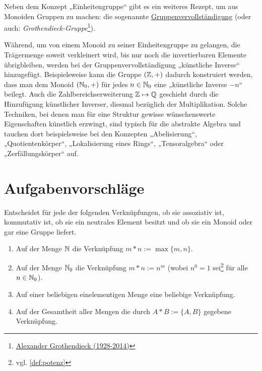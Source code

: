 \begin{vorschau}[* Gruppenvervollständigung] \label{gruppenvervollstaendigung}
    Neben dem Konzept „Einheitengruppe“ gibt es ein weiteres Rezept, um aus Monoiden Gruppen zu machen: die sogenannte \href{https://de.wikipedia.org/wiki/Grothendieck-Gruppe}{Gruppenvervollständigung} (oder auch: \emph{Grothendieck-Gruppe}\footnote{\href{https://de.wikipedia.org/wiki/Alexander_Grothendieck}{Alexander Grothendieck (1928-2014)}}).
    
    Während, um von einem Monoid zu seiner Einheitengruppe zu gelangen, die Trägermenge soweit verkleinert wird, bis nur noch die invertierbaren Elemente übrigbleiben, werden bei der Gruppenvervollständigung „künstliche Inverse“ hinzugefügt. Beispielsweise kann die Gruppe $(\mathbb Z,+)$ dadurch konstruiert werden, dass man dem Monoid $(\mathbb N_0,+)$ für jedes $n\in \mathbb N_0$ eine „künstliche Inverse $-n$“ beilegt. Auch die Zahlbereichserweiterung $\mathbb Z \mapsto \mathbb Q$ geschieht durch die Hinzufügung künstlicher Inverser, diesmal bezüglich der Multiplikation. Solche Techniken, bei denen man für eine Struktur gewisse wünschenswerte Eigenschaften künstlich erzwingt, sind typisch für die abstrakte Algebra und tauchen dort beispielsweise bei den Konzepten „Abelisierung“, „Quotientenkörper“, „Lokalisierung eines Rings“, „Tensoralgebra“ oder „Zerfällungskörper“ auf.
\end{vorschau}





\clearpage
\section{Aufgabenvorschläge}


\begin{aufg} \label{aufg:verknuepfungen}
    Entscheidet für jede der folgenden Verknüpfungen, ob sie assoziativ ist, kommutativ ist, ob sie ein neutrales Element besitzt und ob sie ein Monoid oder gar eine Gruppe liefert.
    \begin{enumerate}
        \item Auf der Menge $\mathbb N$ die Verknüpfung $m*n:=\max \{m,n\}$.
        \item Auf der Menge $\mathbb N_0$ die Verknüpfung $m*n:=n^m$ (wobei $n^0=1$ sei\footnote{vgl. \cref{def:potenz}} für alle $n\in \mathbb N_0$).
        \item Auf einer beliebigen einelementigen Menge eine beliebige Verknüpfung.
        \item Auf der Gesamtheit aller Mengen die durch $A*B:=\{A,B\}$ gegebene Verknüpfung.
    \end{enumerate}
\end{aufg}


